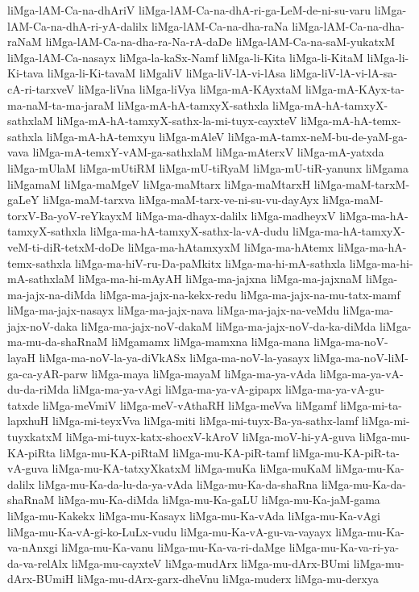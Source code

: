 {liMga-lAM-Ca-na-dhAriV
liMga-lAM-Ca-na-dhA-ri-ga-LeM-de-ni-su-varu
liMga-lAM-Ca-na-dhA-ri-yA-dalilx
liMga-lAM-Ca-na-dha-raNa
liMga-lAM-Ca-na-dha-raNaM
liMga-lAM-Ca-na-dha-ra-Na-rA-daDe
liMga-lAM-Ca-na-saM-yukatxM
liMga-lAM-Ca-nasayx
liMga-la-kaSx-Namf
liMga-li-Kita
liMga-li-KitaM
liMga-li-Ki-tava
liMga-li-Ki-tavaM
liMgaliV
liMga-liV-lA-vi-lAsa
liMga-liV-lA-vi-lA-sa-cA-ri-tarxveV
liMga-liVna
liMga-liVya
liMga-mA-KAyxtaM
liMga-mA-KAyx-ta-ma-naM-ta-ma-jaraM
liMga-mA-hA-tamxyX-sathxla
liMga-mA-hA-tamxyX-sathxlaM
liMga-mA-hA-tamxyX-sathx-la-mi-tuyx-cayxteV
liMga-mA-hA-temx-sathxla
liMga-mA-hA-temxyu
liMga-mAleV
liMga-mA-tamx-neM-bu-de-yaM-ga-vava
liMga-mA-temxY-vAM-ga-sathxlaM
liMga-mAterxV
liMga-mA-yatxda
liMga-mUlaM
liMga-mUtiRM
liMga-mU-tiRyaM
liMga-mU-tiR-yanunx
liMgama
liMgamaM
liMga-maMgeV
liMga-maMtarx
liMga-maMtarxH
liMga-maM-tarxM-gaLeY
liMga-maM-tarxva
liMga-maM-tarx-ve-ni-su-vu-dayAyx
liMga-maM-torxV-Ba-yoV-reYkayxM
liMga-ma-dhayx-dalilx
liMga-madheyxV
liMga-ma-hA-tamxyX-sathxla
liMga-ma-hA-tamxyX-sathx-la-vA-dudu
liMga-ma-hA-tamxyX-veM-ti-diR-tetxM-doDe
liMga-ma-hAtamxyxM
liMga-ma-hAtemx
liMga-ma-hA-temx-sathxla
liMga-ma-hiV-ru-Da-paMkitx
liMga-ma-hi-mA-sathxla
liMga-ma-hi-mA-sathxlaM
liMga-ma-hi-mAyAH
liMga-ma-jajxna
liMga-ma-jajxnaM
liMga-ma-jajx-na-diMda
liMga-ma-jajx-na-kekx-redu
liMga-ma-jajx-na-mu-tatx-mamf
liMga-ma-jajx-nasayx
liMga-ma-jajx-nava
liMga-ma-jajx-na-veMdu
liMga-ma-jajx-noV-daka
liMga-ma-jajx-noV-dakaM
liMga-ma-jajx-noV-da-ka-diMda
liMga-ma-mu-da-shaRnaM
liMgamamx
liMga-mamxna
liMga-mana
liMga-ma-noV-layaH
liMga-ma-noV-la-ya-diVkASx
liMga-ma-noV-la-yasayx
liMga-ma-noV-liM-ga-ca-yAR-parw
liMga-maya
liMga-mayaM
liMga-ma-ya-vAda
liMga-ma-ya-vA-du-da-riMda
liMga-ma-ya-vAgi
liMga-ma-ya-vA-gipapx
liMga-ma-ya-vA-gu-tatxde
liMga-meVmiV
liMga-meV-vAthaRH
liMga-meVva
liMgamf
liMga-mi-ta-lapxhuH
liMga-mi-teyxVva
liMga-miti
liMga-mi-tuyx-Ba-ya-sathx-lamf
liMga-mi-tuyxkatxM
liMga-mi-tuyx-katx-shocxV-kAroV
liMga-moV-hi-yA-guva
liMga-mu-KA-piRta
liMga-mu-KA-piRtaM
liMga-mu-KA-piR-tamf
liMga-mu-KA-piR-ta-vA-guva
liMga-mu-KA-tatxyXkatxM
liMga-muKa
liMga-muKaM
liMga-mu-Ka-dalilx
liMga-mu-Ka-da-lu-da-ya-vAda
liMga-mu-Ka-da-shaRna
liMga-mu-Ka-da-shaRnaM
liMga-mu-Ka-diMda
liMga-mu-Ka-gaLU
liMga-mu-Ka-jaM-gama
liMga-mu-Kakekx
liMga-mu-Kasayx
liMga-mu-Ka-vAda
liMga-mu-Ka-vAgi
liMga-mu-Ka-vA-gi-ko-LuLx-vudu
liMga-mu-Ka-vA-gu-va-vayayx
liMga-mu-Ka-va-nAnxgi
liMga-mu-Ka-vanu
liMga-mu-Ka-va-ri-daMge
liMga-mu-Ka-va-ri-ya-da-va-relAlx
liMga-mu-cayxteV
liMga-mudArx
liMga-mu-dArx-BUmi
liMga-mu-dArx-BUmiH
liMga-mu-dArx-garx-dheVnu
liMga-muderx
liMga-mu-derxya
}
